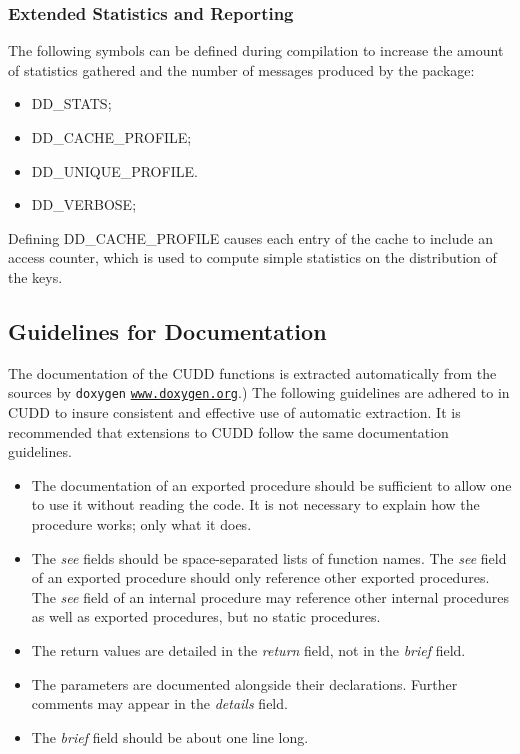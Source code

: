 \documentclass[11pt]{article}
\begin{document}
\subsubsection{Extended Statistics and Reporting}
\label{sec:extendedStats}

The following symbols can be defined during compilation to increase
the amount of statistics gathered and the number of messages produced
by the package:
\begin{itemize}
\item DD\_STATS;
\item DD\_CACHE\_PROFILE;
\item DD\_UNIQUE\_PROFILE.
\item DD\_VERBOSE;
\end{itemize}
Defining DD\_CACHE\_PROFILE causes each entry of the cache to include
an access counter, which is used to compute simple statistics on the
distribution of the keys.

\subsection{Guidelines for Documentation}
\label{sec:doc}

The documentation of the CUDD functions is extracted automatically
from the sources by \texttt{doxygen} 
\href{http://www.doxygen.org}{\texttt{www.doxygen.org}}.)
The following guidelines are adhered to in CUDD to insure consistent and
effective use of automatic extraction. It is recommended that
extensions to CUDD follow the same documentation guidelines.
\begin{itemize}
\item The documentation of an exported procedure should be sufficient
  to allow one to use it without reading the code. It is not necessary
  to explain how the procedure works; only what it does.
\item The \emph{see}
  fields should be space-separated lists of function names.  The
  \emph{see} field of an exported procedure should only reference
  other exported procedures. The \emph{see} field of an internal
  procedure may reference other internal procedures as well as
  exported procedures, but no static procedures.
\item The return values are detailed in the
  \emph{return}
  field, not in the
  \emph{brief} field.
\item The parameters are documented alongside their declarations.
  Further comments may appear in the \emph{details} field.
\item The \emph{brief} field should be about one line long.
\end{itemize}
\end{document}
